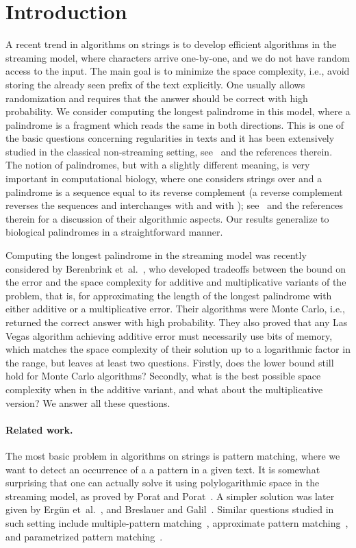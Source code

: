 \documentclass{article}[11pt,letter]
\newcommand{\ie}{i.e.\xspace}
\newcommand{\etal}{et~al.}
\begin{document}
\section{Introduction}
A recent trend in algorithms on strings is to develop efficient algorithms in the streaming model, where
characters arrive one-by-one, and we do not have random access to the input. The main goal is to minimize
the space complexity, \ie, avoid storing the already seen prefix of the text explicitly. One usually allows
randomization and requires that the answer should be correct with high probability.
We consider computing the longest palindrome in this model, where a palindrome is a fragment which
reads the same in both directions. This is one of the basic questions concerning regularities in texts
and it has been extensively studied in the classical non-streaming setting, see~\cite{Apostolico,GalilSeiferas,KMP,Manacher}
and the references therein. The notion of palindromes, but with a slightly different meaning, is
very important in
computational biology, where one considers strings over  and a palindrome is a sequence
equal to its reverse complement (a reverse complement reverses the sequences and interchanges
 with  and  with ); see~\cite{GawrychowskiSTACS} and the references therein for
a discussion of their algorithmic aspects. Our results generalize to biological palindromes
in a straightforward manner.

Computing the longest palindrome in the streaming model was recently considered by Berenbrink \etal~\cite{Berenbrink},
who developed tradeoffs between the bound on the error and the space complexity for additive and multiplicative variants of the problem, that is,
for approximating the length of the longest palindrome with either additive or a multiplicative error.
Their algorithms were Monte Carlo, \ie, returned the correct answer with high probability. They also proved
that any Las Vegas algorithm achieving additive error  must necessarily use  bits of memory,
which matches the space complexity of their solution up to a logarithmic factor in the  range,
but leaves at least two questions. Firstly, does the lower bound still hold for Monte Carlo algorithms? Secondly, 
what is the best possible space complexity when  in the additive variant,
and what about the multiplicative version? We answer all these questions.


\paragraph{Related work.} The most basic problem in algorithms on strings is pattern matching, where we want to detect an occurrence of a a pattern in a given text.
It is somewhat surprising that one can actually solve it using polylogarithmic space in the streaming model,
as proved by Porat and Porat~\cite{PoratStreaming}. A simpler solution was later given by Erg{\"u}n \etal~\cite{ErgunPeriodicity}, and Breslauer
and Galil~\cite{Breslauer}. Similar questions studied in such setting include multiple-pattern
matching~\cite{DictionaryStream}, approximate pattern matching~\cite{KMismatch}, and
parametrized pattern matching~\cite{ParametrizedStreaming}.
\end{document}
